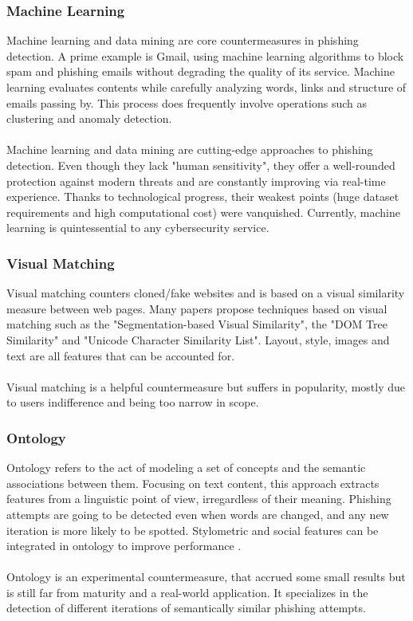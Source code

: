 \documentclass[a4paper]{article}
\begin{document}
\subsubsection{Machine Learning}

Machine learning and data mining are core countermeasures in phishing detection. A prime example is Gmail, using machine learning algorithms to block spam and phishing emails without degrading the quality of its service. Machine learning evaluates contents while carefully analyzing words, links and structure of emails passing by. This process does frequently involve operations such as clustering and anomaly detection.
\\ \\
Machine learning and data mining are cutting-edge approaches to phishing detection. Even though they lack "human sensitivity", they offer a well-rounded protection against modern threats and are constantly improving via real-time experience. Thanks to technological progress, their weakest points (huge dataset requirements and high computational cost) were vanquished. Currently, machine learning is quintessential to any cybersecurity service.

\subsubsection{Visual Matching}

Visual matching counters cloned/fake websites and is based on a visual similarity measure between web pages. Many papers propose techniques based on visual matching such as the "Segmentation-based Visual Similarity", the "DOM Tree Similarity" and "Unicode Character Similarity List". Layout, style, images and text are all features that can be accounted for.
\\ \\
Visual matching is a helpful countermeasure but suffers in popularity, mostly due to users indifference and being too narrow in scope.

\subsubsection{Ontology}

Ontology refers to the act of modeling a set of concepts and the semantic associations between them. Focusing on text content, this approach extracts features from a linguistic point of view, irregardless of their meaning. Phishing attempts are going to be detected even when words are changed, and any new iteration is more likely to be spotted. Stylometric and social features can be integrated in ontology to improve performance \cite{lit-other-stylometric}.
\\ \\
Ontology is an experimental countermeasure, that accrued some small results but is still far from maturity and a real-world application. It specializes in the detection of different iterations of semantically similar phishing attempts.
\end{document}
